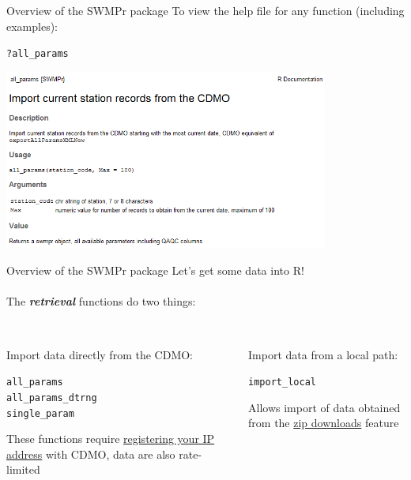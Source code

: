 \documentclass[xcolor=svgnames]{beamer}\usepackage[]{graphicx}\usepackage[]{color}
\makeatletter
\newcommand{\hlopt}[1]{\textcolor[rgb]{0,0,0}{#1}}%
\newcommand{\hlstd}[1]{\textcolor[rgb]{0.345,0.345,0.345}{#1}}%
\newenvironment{kframe}{%
 \def\at@end@of@kframe{}%
 \ifinner\ifhmode%
  \def\at@end@of@kframe{\end{minipage}}%
  \begin{minipage}{\columnwidth}%
 \fi\fi%
 \def\FrameCommand##1{\hskip\@totalleftmargin \hskip-\fboxsep
 \colorbox{shadecolor}{##1}\hskip-\fboxsep
     \hskip-\linewidth \hskip-\@totalleftmargin \hskip\columnwidth}%
 \MakeFramed {\advance\hsize-\width
   \@totalleftmargin\z@ \linewidth\hsize
   \@setminipage}}%
 {\par\unskip\endMakeFramed%
 \at@end@of@kframe}
\newenvironment{knitrout}{}{} %
\newcommand{\Bigtxt}[1]{\textbf{\textit{#1}}}
\makeatother
\begin{document}
\begin{frame}[fragile]{Overview of the SWMPr package}
To view the help file for any function (including examples):
\begin{knitrout}
\color{fgcolor}\begin{kframe}
\begin{alltt}
\hlopt{?}\hlstd{all_params}
\end{alltt}
\end{kframe}
\end{knitrout}
\centerline{\includegraphics[width = 0.8\textwidth]{help_ex.png}}
\end{frame}

\begin{frame}[fragile]{Overview of the SWMPr package}
Let's get some data into R!\\~\\
The \Bigtxt{retrieval} functions do two things: \\~\\
\begin{columns}[t]
\begin{column}{0.4\textwidth}
Import data directly from the CDMO:
\begin{knitrout}
\color{fgcolor}\begin{kframe}
\begin{alltt}
\hlstd{all_params}
\hlstd{all_params_dtrng}
\hlstd{single_param}
\end{alltt}
\end{kframe}
\end{knitrout}
These functions require \href{http://cdmo.baruch.sc.edu/webservices.cfm}{registering your IP address}  with CDMO, data are also rate-limited
\end{column}
\begin{column}{0.4\textwidth}
Import data from a local path:
\begin{knitrout}
\color{fgcolor}\begin{kframe}
\begin{alltt}
\hlstd{import_local}
\end{alltt}
\end{kframe}
\end{knitrout}
Allows import of data obtained from the \href{http://cdmo.baruch.sc.edu/aqs/zips.cfm}{zip downloads} feature
\end{column}
\end{columns}
\end{frame}
\end{document}
